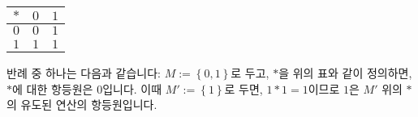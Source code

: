 \documentclass[12pt]{paper}
\begin{document}
  \begin{table}[ht]
    \centering
    \label{t1}
    \begin{tabular}{|c|c|c|}
    \noalign{\smallskip}\noalign{\smallskip}\hline
    $*$ & $0$ & $1$ \\
    \hline
    $0$ & $0$ & $1$ \\
    \hline
    $1$ & $1$ & $1$ \\
    \hline
    \end{tabular}
  \end{table}
  반례 중 하나는 다음과 같습니다:
  $M := \left\{ 0 , 1 \right\}$로 두고,
  $*$을 위의 표와 같이 정의하면, 
  $*$에 대한 항등원은 $0$입니다.
  이때 $M' := \left\{ 1 \right\}$로 두면,
  $1 * 1 = 1$이므로 $1$은 $M'$ 위의 $*$의 유도된 연산의 항등원입니다.

  

  
\end{document}
